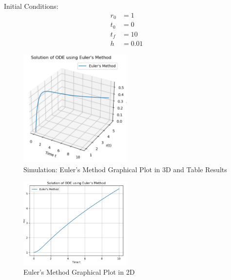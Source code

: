 \documentclass{article}
\begin{document}
Initial Conditions:
\begin{align*}
r_0 &= 1 \\
t_0 &= 0 \\
t_f &= 10 \\
h &= 0.01
\end{align*}


\begin{figure}[H]
    \centering
    \includegraphics[width=0.5\textwidth]{./src/figures/euler_method_3d_plot.PNG} 
    \caption{Simulation: Euler's Method Graphical Plot in 3D and Table Results}
    \label{fig:euler_3d_plot}
\end{figure}

\begin{figure}[H]
    \centering
    \includegraphics[width=0.5\textwidth]{./src/figures/euler_method_2d_plot.PNG} 
    \caption{Euler's Method Graphical Plot in 2D}
    \label{fig:euler_2d_plot}
\end{figure}
\end{document}
